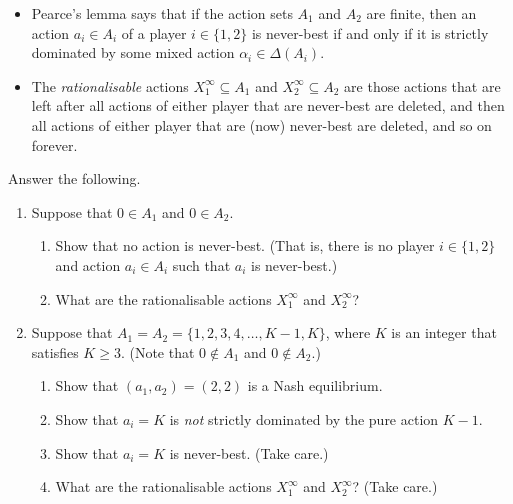 \begin{exercise}
\begin{itemize}
		\item Pearce's lemma says that if the action sets $A_1$ and $A_2$ are finite, then an action $a_i \in A_i$ of a player $i \in \{1,2\}$ is never-best if and only if it is strictly dominated by some mixed action $\alpha_i \in \Delta(A_i)$.

		\item The \emph{rationalisable} actions $X_1^\infty \subseteq A_1$ and $X_2^\infty \subseteq A_2$ are those actions that are left after all actions of either player that are never-best are deleted, and then all actions of either player that are (now) never-best are deleted, and so on forever.

	\end{itemize}
	Answer the following.

	\begin{enumerate}[label=(\alph*)]

		\item Suppose that $0 \in A_1$ and $0 \in A_2$.

		\begin{enumerate}[label=(\roman*)]
		
			\item Show that no action is never-best. (That is, there is no player $i \in \{1,2\}$ and action $a_i \in A_i$ such that $a_i$ is never-best.)

			\item What are the rationalisable actions $X_1^\infty$ and $X_2^\infty$?
		
		\end{enumerate}

		\item Suppose that $A_1 = A_2 = \{1,2,3,4,\dots,K-1,K\}$, where $K$ is an integer that satisfies $K \geq 3$. (Note that $0 \notin A_1$ and $0 \notin A_2$.)

		\begin{enumerate}[label=(\roman*)]

			\item Show that $(a_1,a_2) = (2,2)$ is a Nash equilibrium.
		
			\item Show that $a_i = K$ is \emph{not} strictly dominated by the pure action $K-1$.

			\item Show that $a_i = K$ is never-best. (Take care.)

			\item What are the rationalisable actions $X_1^\infty$ and $X_2^\infty$? (Take care.)


\end{enumerate}
\end{enumerate}
\end{exercise}
